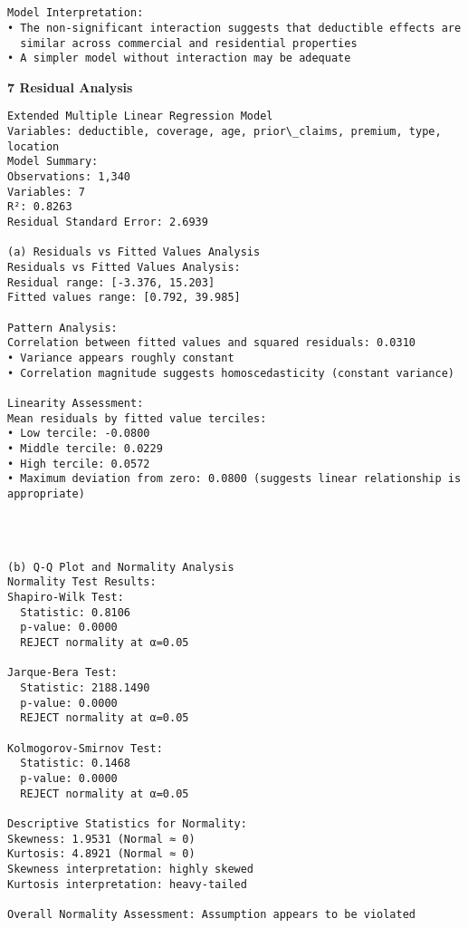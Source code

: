 \documentclass[8pt, twocolumn]{extarticle}
\begin{document}
    \begin{center}
    \end{center}
    { \hspace*{\fill} \\}
    
    \begin{Verbatim}[commandchars=\\\{\}]

Model Interpretation:
• The non-significant interaction suggests that deductible effects are
  similar across commercial and residential properties
• A simpler model without interaction may be adequate
    \end{Verbatim}
    \textbf{7 Residual Analysis}
    \begin{Verbatim}[commandchars=\\\{\}]
Extended Multiple Linear Regression Model
Variables: deductible, coverage, age, prior\_claims, premium, type, location
Model Summary:
Observations: 1,340
Variables: 7
R²: 0.8263
Residual Standard Error: 2.6939

(a) Residuals vs Fitted Values Analysis
Residuals vs Fitted Values Analysis:
Residual range: [-3.376, 15.203]
Fitted values range: [0.792, 39.985]

Pattern Analysis:
Correlation between fitted values and squared residuals: 0.0310
• Variance appears roughly constant
• Correlation magnitude suggests homoscedasticity (constant variance)

Linearity Assessment:
Mean residuals by fitted value terciles:
• Low tercile: -0.0800
• Middle tercile: 0.0229
• High tercile: 0.0572
• Maximum deviation from zero: 0.0800 (suggests linear relationship is
appropriate)
    \end{Verbatim}

    \begin{center}
    \end{center}
    { \hspace*{\fill} \\}
    
    \begin{Verbatim}[commandchars=\\\{\}]

(b) Q-Q Plot and Normality Analysis
Normality Test Results:
Shapiro-Wilk Test:
  Statistic: 0.8106
  p-value: 0.0000
  REJECT normality at α=0.05

Jarque-Bera Test:
  Statistic: 2188.1490
  p-value: 0.0000
  REJECT normality at α=0.05

Kolmogorov-Smirnov Test:
  Statistic: 0.1468
  p-value: 0.0000
  REJECT normality at α=0.05

Descriptive Statistics for Normality:
Skewness: 1.9531 (Normal ≈ 0)
Kurtosis: 4.8921 (Normal ≈ 0)
Skewness interpretation: highly skewed
Kurtosis interpretation: heavy-tailed

Overall Normality Assessment: Assumption appears to be violated
    \end{Verbatim}
\end{document}
